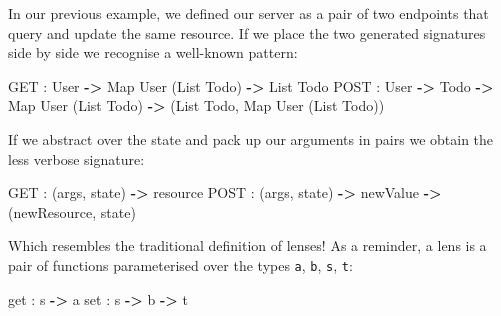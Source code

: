\documentclass[sigplan,screen,review, nonacm]{acmart}
\newenvironment{Shaded}{}{}
\newcommand{\DataTypeTok}[1]{\textcolor[rgb]{0.56,0.13,0.00}{#1}}
\newcommand{\FunctionTok}[1]{\textcolor[rgb]{0.02,0.16,0.49}{#1}}
\newcommand{\KeywordTok}[1]{\textcolor[rgb]{0.00,0.44,0.13}{\textbf{#1}}}
\newcommand{\NormalTok}[1]{#1}
\newcommand{\OperatorTok}[1]{\textcolor[rgb]{0.40,0.40,0.40}{#1}}
\newcommand{\OtherTok}[1]{\textcolor[rgb]{0.00,0.44,0.13}{#1}}
\begin{document}
In our previous example, we defined our server as a pair of two
endpoints that query and update the same resource. If we place the two
generated signatures side by side we recognise a well-known pattern:

\begin{Shaded}
\begin{Highlighting}[]
\FunctionTok{GET}  \OperatorTok{:} \DataTypeTok{User} \KeywordTok{{-}\textgreater{}} \OtherTok{Map} \DataTypeTok{User}\NormalTok{ (}\OtherTok{List} \DataTypeTok{Todo}\NormalTok{) }\KeywordTok{{-}\textgreater{}} \OtherTok{List} \DataTypeTok{Todo}
\FunctionTok{POST} \OperatorTok{:} \DataTypeTok{User} \KeywordTok{{-}\textgreater{}} \DataTypeTok{Todo} \KeywordTok{{-}\textgreater{}} \OtherTok{Map} \DataTypeTok{User}\NormalTok{ (}\OtherTok{List} \DataTypeTok{Todo}\NormalTok{) }\KeywordTok{{-}\textgreater{}}
\NormalTok{            (}\OtherTok{List} \DataTypeTok{Todo}\NormalTok{, }\OtherTok{Map} \DataTypeTok{User}\NormalTok{ (}\OtherTok{List} \DataTypeTok{Todo}\NormalTok{))}
\end{Highlighting}
\end{Shaded}

If we abstract over the state and pack up
our arguments in pairs we obtain the less verbose signature:

\begin{Shaded}
\begin{Highlighting}[]
\FunctionTok{GET}  \OperatorTok{:} \NormalTok{(args, state) }\KeywordTok{{-}\textgreater{}}\NormalTok{ resource}
\FunctionTok{POST} \OperatorTok{:} \NormalTok{(args, state) }\KeywordTok{{-}\textgreater{}}\NormalTok{ newValue }\KeywordTok{{-}\textgreater{}}
            \NormalTok{(newResource, state)}
\end{Highlighting}
\end{Shaded}

Which resembles the traditional definition of
lenses\cite{profunctors}! As a reminder, a lens is a pair of functions parameterised over
the types \texttt{a}, \texttt{b}, \texttt{s}, \texttt{t}:

\begin{Shaded}
\begin{Highlighting}[]
\FunctionTok{get }\OperatorTok{:}\NormalTok{ s }\KeywordTok{{-}\textgreater{}}\NormalTok{ a}
\FunctionTok{set }\OperatorTok{:}\NormalTok{ s }\KeywordTok{{-}\textgreater{}}\NormalTok{ b }\KeywordTok{{-}\textgreater{}}\NormalTok{ t}
\end{Highlighting}
\end{Shaded}
\end{document}
